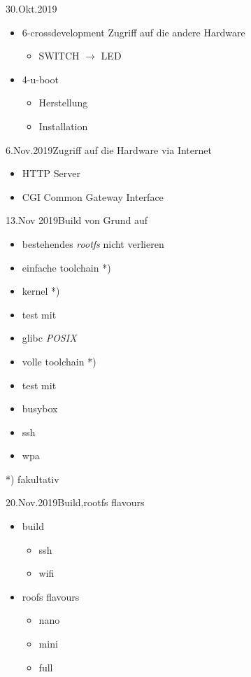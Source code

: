 \documentclass{beamer}
\begin{document}
\begin{frame}{30.Okt.2019}
 \begin{itemize}
  \item 6-crossdevelopment Zugriff auf die andere Hardware
  \begin{itemize}
   \item SWITCH $\to$ LED
  \end{itemize}
  \item 4-u-boot
  \begin{itemize}
   \item Herstellung
   \item Installation
  \end{itemize}
 \end{itemize}
\end{frame}

\begin{frame}{6.Nov.2019}{Zugriff auf die Hardware via Internet}
 \begin{itemize}
  \item HTTP Server 
  \item CGI Common Gateway Interface
 \end{itemize}
\end{frame}


\begin{frame}{13.Nov 2019}{Build von Grund auf}
 \begin{itemize}
  \item bestehendes {\em rootfs} nicht verlieren
  \item einfache toolchain *)
  \item kernel             *)
  \item test mit 
  \item glibc {\em POSIX}
  \item volle toolchain    *)
  \item test mit 
  \item busybox
  \item ssh
  \item wpa
 \end{itemize}
 *) fakultativ
\end{frame}

\begin{frame}{20.Nov.2019}{Build,rootfs flavours}
 \begin{itemize}
  \item build
  \begin{itemize}
   \item ssh
   \item wifi
  \end{itemize}
  \item roofs flavours
  \begin{itemize}
   \item nano
   \item mini
   \item full
  \end{itemize}
 \end{itemize}
\end{frame}
\end{document}
